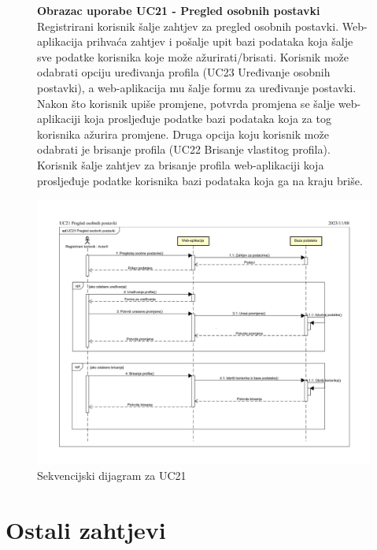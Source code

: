 			\begin{figure}[H]
				\textbf{Obrazac uporabe UC21 - Pregled osobnih postavki}\\

				Registrirani korisnik šalje zahtjev za pregled osobnih postavki. Web-aplikacija prihvaća zahtjev i pošalje upit bazi podataka koja šalje sve podatke korisnika koje može ažurirati/brisati. Korisnik može odabrati opciju uređivanja profila (UC23 Uređivanje osobnih postavki), a web-aplikacija mu šalje formu za uređivanje postavki. Nakon što korisnik upiše promjene, potvrda promjena se šalje web-aplikaciji koja prosljeđuje podatke bazi podataka koja za tog korisnika ažurira promjene. Druga opcija koju korisnik može odabrati je brisanje profila (UC22 Brisanje vlastitog profila). Korisnik šalje zahtjev za brisanje profila web-aplikaciji koja prosljeđuje podatke korisnika bazi podataka koja ga na kraju briše.
				\begin{center}
					\includegraphics[scale = 0.8]{slike/SEK_UC21_Pregled_osobnih_postavki.png}
					\caption{Sekvencijski dijagram za UC21}
					\label{fig:Sek_UC21}
				\end{center}
			\end{figure}
				
			\eject
	
		\section{Ostali zahtjevi}
			 
